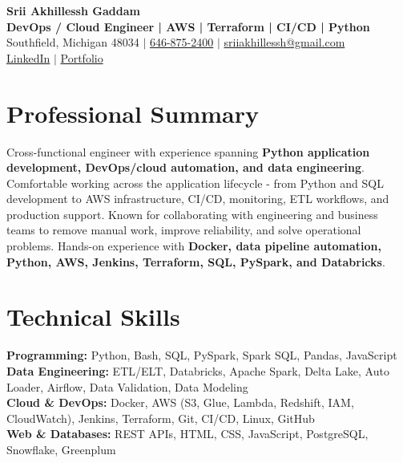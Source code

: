 \documentclass[letterpaper,10pt]{article}
\begin{document}
\fontsize{9.35pt}{10.45pt}\selectfont

\begin{center}
    {\LARGE \textbf{Srii Akhillessh Gaddam}} \\[-1pt]
    \textbf{DevOps / Cloud Engineer | AWS | Terraform | CI/CD | Python} \\[2pt]
    Southfield, Michigan 48034 $|$
    \href{tel:6468752400}{646-875-2400} $|$
    \href{mailto:sriiakhillessh@gmail.com}{sriiakhillessh@gmail.com} \\[1pt]
    \href{https://www.linkedin.com/in/srii-akhiilessh-gaddam-b48668191/}{LinkedIn} $|$
    \href{https://sriiakhillesshg.github.io/portfolio/}{Portfolio}
\end{center}
\vspace{-8pt}

\section{Professional Summary}
\small{Cross-functional engineer with experience spanning \textbf{Python application development, DevOps/cloud automation, and data engineering}. Comfortable working across the application lifecycle - from Python and SQL development to AWS infrastructure, CI/CD, monitoring, ETL workflows, and production support. Known for collaborating with engineering and business teams to remove manual work, improve reliability, and solve operational problems. Hands-on experience with \textbf{Docker, data pipeline automation, Python, AWS, Jenkins, Terraform, SQL, PySpark, and Databricks}.}

\section{Technical Skills}
\small{
\textbf{Programming:} Python, Bash, SQL, PySpark, Spark SQL, Pandas, JavaScript \\
\textbf{Data Engineering:} ETL/ELT, Databricks, Apache Spark, Delta Lake, Auto Loader, Airflow, Data Validation, Data Modeling \\
\textbf{Cloud \& DevOps:} Docker, AWS (S3, Glue, Lambda, Redshift, IAM, CloudWatch), Jenkins, Terraform, Git, CI/CD, Linux, GitHub \\
\textbf{Web \& Databases:} REST APIs, HTML, CSS, JavaScript, PostgreSQL, Snowflake, Greenplum
}
\end{document}
